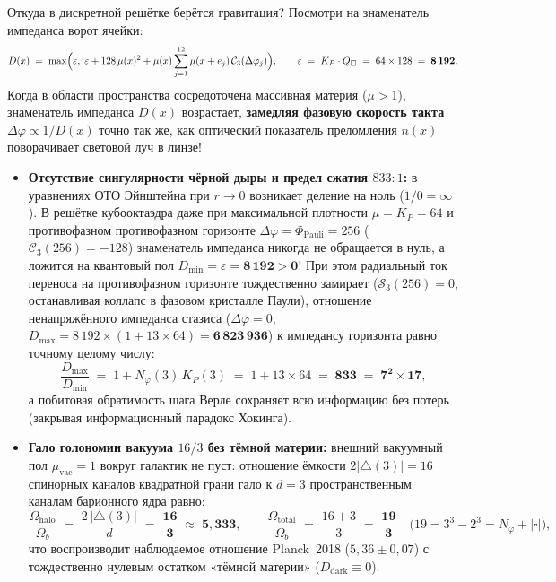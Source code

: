 Откуда в дискретной решётке берётся гравитация? Посмотри на знаменатель импеданса ворот ячейки:
\[
  D(x) \;=\; \max\Bigl(\varepsilon,\; \varepsilon + 128\,\mu(x)^2 + \mu(x)\sum_{j=1}^{12}\mu(x+e_j)\,\mathcal{C}_3(\Delta\varphi_j)\Bigr),
  \qquad \varepsilon \;=\; K_P\cdot Q_\square \;=\; 64\times 128 \;=\; \mathbf{8\,192}.
\]
Когда в области пространства сосредоточена массивная материя ($\mu > 1$), знаменатель импеданса $D(x)$ возрастает, \textbf{замедляя фазовую скорость такта} $\Delta\varphi \propto 1/D(x)$ точно так же, как оптический показатель преломления $n(x)$ поворачивает световой луч в линзе!
\begin{itemize}[leftmargin=*]
\item \textbf{Отсутствие сингулярности чёрной дыры и предел сжатия $833:1$:}
  в уравнениях ОТО Эйнштейна при $r\to 0$ возникает деление на ноль ($1/0 = \infty$). В решётке кубооктаэдра даже при максимальной плотности $\mu = K_P = 64$ и противофазном противофазном горизонте $\Delta\varphi = \Phi_{\mathrm{Pauli}} = 256$ ($\mathcal{C}_3(256) = -128$) знаменатель импеданса никогда не обращается в нуль, а ложится на квантовый пол $D_{\min} = \varepsilon = \mathbf{8\,192 > 0}$! При этом радиальный ток переноса на противофазном горизонте тождественно замирает ($\mathcal{S}_3(256) = 0$, останавливая коллапс в фазовом кристалле Паули), отношение ненапряжённого импеданса стазиса ($\Delta\varphi=0$, $D_{\max} = 8\,192\times(1 + 13\times 64) = \mathbf{6\,823\,936}$) к импедансу горизонта равно точному целому числу:
  \[
    \frac{D_{\max}}{D_{\min}} \;=\; 1 + N_\varphi(3)\,K_P(3) \;=\; 1 + 13\times 64 \;=\; \mathbf{833 \;=\; 7^2 \times 17},
  \]
  а побитовая обратимость шага Верле сохраняет всю информацию без потерь (закрывая информационный парадокс Хокинга).
\item \textbf{Гало голономии вакуума $16/3$ без тёмной материи:}
  внешний вакуумный пол $\mu_{\mathrm{vac}} = 1$ вокруг галактик не пуст: отношение ёмкости $2|{\triangle}(3)| = 16$ спинорных каналов квадратной грани гало к $d = 3$ пространственным каналам барионного ядра равно:
  \[
    \frac{\Omega_{\mathrm{halo}}}{\Omega_b} \;=\; \frac{2\,|{\triangle}(3)|}{d} \;=\; \mathbf{\frac{16}{3} \;\approx\; 5{,}333},
    \qquad
    \frac{\Omega_{\mathrm{total}}}{\Omega_b} \;=\; \frac{16 + 3}{3} \;=\; \mathbf{\frac{19}{3}} \quad \bigl(19 = 3^3 - 2^3 = N_\varphi + |\square|\bigr),
  \]
  что воспроизводит наблюдаемое отношение Planck~2018 ($5{,}36\pm 0{,}07$) с тождественно нулевым остатком «тёмной материи» ($D_{\mathrm{dark}}\equiv 0$).
\end{itemize}

